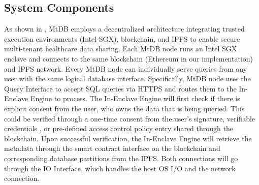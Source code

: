 \documentclass[conference]{IEEEtran}
\newcommand{\showkot}[1]{ {\color{red}{#1}}}
\newcommand{\seokki}[1]{ {\color{orange}{#1}}}
\newcommand{\ours}{\xspace MtDB\xspace}
\begin{document}
\subsection{System Components}
\label{sec:architecture}
As shown in , \ours employs a decentralized architecture integrating trusted execution environments (Intel SGX), blockchain, and IPFS to enable secure multi-tenant healthcare data sharing. 
Each \ours node runs an Intel SGX enclave and connects to the same blockchain (Ethereum in our implementation) and IPFS network.
Every \ours node can individually serve queries from any user with the same logical database interface. 
Specifically, \ours node uses the Query Interface to accept SQL queries via HTTPS and routes them to the In-Enclave Engine to process. The In-Enclave Engine will first check if there is explicit consent from the user, who owns the data that is being queried. This could be verified through a one-time consent from the user's signature, verifiable credentials \cite{noauthor_verifiable_nodate}, or pre-defined access control policy entry shared through the blockchain. Upon successful verification, the In-Enclave Engine will retrieve the 
metadata through the smart contract interface on the blockchain and corresponding database partitions from the IPFS. Both connections will go through the IO Interface, which handles the host OS I/O and the network connection.
\end{document}

